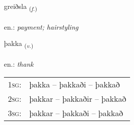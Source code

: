 \documentclass[frontgrid, backgrid]{flacards}\usepackage[]{graphicx}\usepackage[]{xcolor}
\begin{document}
{greiðsla \small{\textsubscript{(\textit{f.})}} \\[1ex] %
\textphonetic{[kreiðstla]} \\
en.: \emph{payment; hairstyling} \\  [2ex]
\renewcommand*{\arraystretch}{0.8}
}

\renewcommand{\flhead}{\vskip5pt \fboxsep=0pt {\small\bfseries\footnotesize Sagnorð | Verb}}
\renewcommand{\fcfoot}{\vskip5pt \fboxsep=0pt \hspace{2pt}{\small\bfseries\footnotesize 1K}}

\renewcommand{\blhead}{\vskip5pt {\small\bfseries\footnotesize Sagnorð | Verb }}
\renewcommand{\bcfoot}{\vskip5pt \hspace{2pt}{\small\bfseries\footnotesize 1K}}


{þakka \small{\textsubscript{(\textit{v.})}} \\[1ex] %
\textphonetic{[θahka]} \\
en.: \emph{thank} \\  [2ex]
\renewcommand*{\arraystretch}{0.8}
\begin{tabular}{p{1cm}l}
\textsc{1sg}: & þakka -- þakkaði -- þakkað \\ 
\textsc{2sg}: & þakkar -- þakkaðir -- þakkað \\ 
\textsc{3sg}: & þakkar -- þakkaði -- þakkað \\ 
\end{tabular}
}

\renewcommand{\flhead}{\vskip5pt \fboxsep=0pt {\small\bfseries\footnotesize Sagnorð | Verb}}
\renewcommand{\fcfoot}{\vskip5pt \fboxsep=0pt \hspace{2pt}{\small\bfseries\footnotesize 1K}}
\end{document}

